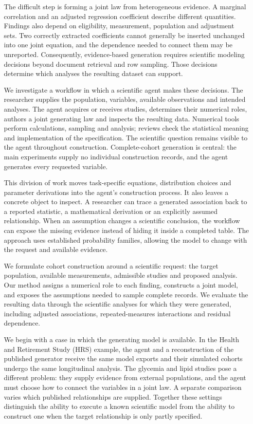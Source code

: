 \documentclass[sigconf,anonymous,review]{acmart}
\begin{document}
The difficult step is forming a joint law from heterogeneous evidence. A marginal correlation and an adjusted regression coefficient describe different quantities. Findings also depend on eligibility, measurement, population and adjustment sets. Two correctly extracted coefficients cannot generally be inserted unchanged into one joint equation, and the dependence needed to connect them may be unreported. Consequently, evidence-based generation requires scientific modeling decisions beyond document retrieval and row sampling. Those decisions determine which analyses the resulting dataset can support.


We investigate a workflow in which a scientific agent makes these decisions. The researcher supplies the population, variables, available observations and intended analyses. The agent acquires or receives studies, determines their numerical roles, authors a joint generating law and inspects the resulting data. Numerical tools perform calculations, sampling and analysis; reviews check the statistical meaning and implementation of the specification. The scientific question remains visible to the agent throughout construction. Complete-cohort generation is central: the main experiments supply no individual construction records, and the agent generates every requested variable.


This division of work moves task-specific equations, distribution choices and parameter derivations into the agent's construction process. It also leaves a concrete object to inspect. A researcher can trace a generated association back to a reported statistic, a mathematical derivation or an explicitly assumed relationship. When an assumption changes a scientific conclusion, the workflow can expose the missing evidence instead of hiding it inside a completed table. The approach uses established probability families, allowing the model to change with the request and available evidence.


We formulate cohort construction around a scientific request: the target population, available measurements, admissible studies and proposed analysis. Our method assigns a numerical role to each finding, constructs a joint model, and exposes the assumptions needed to sample complete records. We evaluate the resulting data through the scientific analyses for which they were generated, including adjusted associations, repeated-measures interactions and residual dependence.


We begin with a case in which the generating model is available. In the Health and Retirement Study (HRS) example, the agent and a reconstruction of the published generator receive the same model exports and their simulated cohorts undergo the same longitudinal analysis. The glycemia and lipid studies pose a different problem: they supply evidence from external populations, and the agent must choose how to connect the variables in a joint law. A separate comparison varies which published relationships are supplied. Together these settings distinguish the ability to execute a known scientific model from the ability to construct one when the target relationship is only partly specified.
\end{document}
